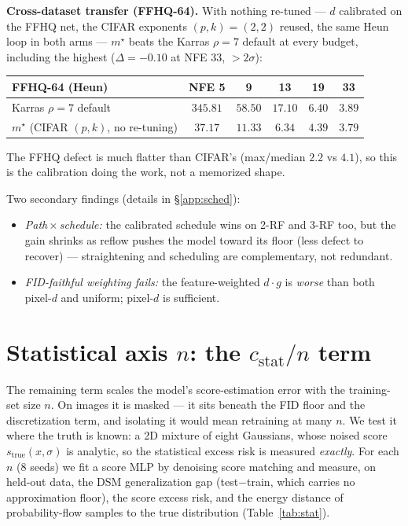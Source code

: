 \documentclass[11pt]{article}
\begin{document}
\medskip
\noindent\textbf{Cross-dataset transfer (FFHQ-64).} With nothing re-tuned ---
$d$ calibrated on the FFHQ net, the CIFAR exponents $(p,k)=(2,2)$ reused, the
same Heun loop in both arms --- $m^\star$ beats the Karras $\rho\!=\!7$ default
at every budget, including the highest ($\Delta=-0.10$ at NFE 33, $>2\sigma$):

\begin{center}\small
\begin{tabular}{lccccc}
\toprule
FFHQ-64 (Heun) & NFE 5 & 9 & 13 & 19 & 33\\
\midrule
Karras $\rho\!=\!7$ default & $345.81$ & $58.50$ & $17.10$ & $6.40$ & $3.89$\\
$m^\star$ (CIFAR $(p,k)$, no re-tuning) & $\mathbf{37.17}$ & $\mathbf{11.33}$ & $\mathbf{6.34}$ & $\mathbf{4.39}$ & $\mathbf{3.79}$\\
\bottomrule
\end{tabular}
\end{center}

\noindent The FFHQ defect is much flatter than CIFAR's (max/median $2.2$ vs
$4.1$), so this is the calibration doing the work, not a memorized shape.

\medskip
\noindent Two secondary findings (details in \S\ref{app:sched}):
\begin{itemize}\itemsep2pt
\item\emph{Path\,$\times$\,schedule:} the calibrated schedule wins on 2-RF
and 3-RF too, but the gain shrinks as reflow pushes the model toward its
floor (less defect to recover) --- straightening and scheduling are
complementary, not redundant.
\item\emph{FID-faithful weighting fails:} the feature-weighted $d\!\cdot\!g$
is \emph{worse} than both pixel-$d$ and uniform; pixel-$d$ is sufficient.
\end{itemize}

\section{Statistical axis $n$: the $c_{\mathrm{stat}}/n$ term}
\label{sec:stat}
The remaining term scales the model's score-estimation error with the
training-set size $n$. On images it is masked --- it sits beneath the FID floor
and the discretization term, and isolating it would mean retraining at many
$n$. We test it where the truth is known: a 2D mixture of eight Gaussians,
whose noised score $s_{\mathrm{true}}(x,\sigma)$ is analytic, so the statistical
excess risk is measured \emph{exactly}. For each $n$ (8 seeds) we fit a score
MLP by denoising score matching and measure, on held-out data, the DSM
generalization gap (test$-$train, which carries no approximation floor), the
score excess risk, and the energy distance of probability-flow samples to the
true distribution (Table~\ref{tab:stat}).
\end{document}
